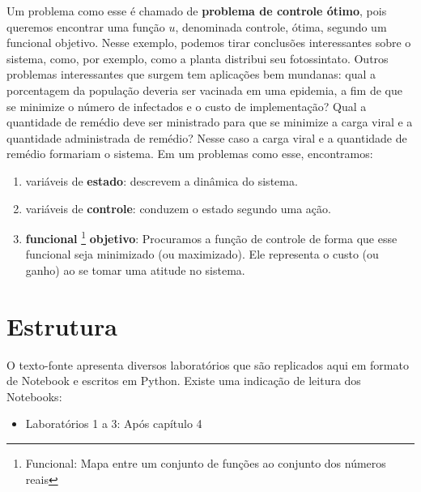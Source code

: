 Um problema como esse é chamado de \textbf{problema de controle ótimo}, pois
queremos encontrar uma função $u$, denominada controle, ótima, segundo um
funcional objetivo. Nesse exemplo, podemos tirar conclusões interessantes
sobre o sistema, como, por exemplo, como a planta distribui seu fotossintato.
Outros problemas interessantes que surgem tem aplicações bem mundanas: qual a
porcentagem da população deveria ser vacinada em uma epidemia, a fim de que se
minimize o número de infectados e o custo de implementação? Qual a quantidade
de remédio deve ser ministrado para que se minimize a carga viral e a
quantidade administrada de remédio? Nesse caso a carga viral e a quantidade de
remédio formariam o sistema.  
Em um problemas como esse, encontramos: 
\begin{enumerate}
    \item variáveis de \textbf{estado}: descrevem a dinâmica do sistema. 
    \item variáveis de \textbf{controle}: conduzem o estado segundo uma ação. 
    \item \textbf{funcional} \footnote{Funcional: Mapa entre um conjunto de funções ao
    conjunto dos números reais} \textbf{objetivo}: Procuramos a função de
    controle de forma que esse funcional seja minimizado (ou maximizado). Ele
    representa o custo (ou ganho) ao se tomar uma atitude no sistema. 
\end{enumerate}

\section{Estrutura}

O texto-fonte apresenta diversos laboratórios que são replicados aqui em
formato de Notebook e escritos em Python. Existe uma indicação de leitura dos
Notebooks: 

\begin{itemize}
    \item Laboratórios 1 a 3: Após capítulo 4
\end{itemize}
